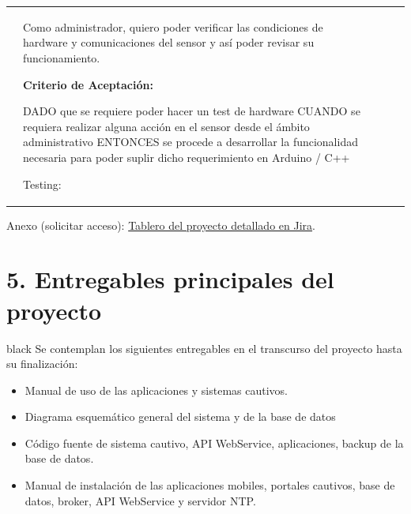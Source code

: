 \documentclass[11pt]{charter}
\begin{document}
\begin{landscape}
\begin{tabularx}{\linewidth}{@{}|p{1.3cm}|p{17cm}|p{1.7cm}|p{1.5cm}|p{1.7cm}|@{}}
         &  \begin{description}                 
                   \item Como administrador, quiero poder   verificar las condiciones de hardware y comunicaciones del sensor y así poder   revisar su funcionamiento.                 
                   \item \textbf{Criterio de Aceptación:}                 
                   \item DADO que se requiere poder hacer un test de hardware CUANDO se requiera realizar alguna acción en el sensor desde el ámbito   administrativo ENTONCES se procede a desarrollar la funcionalidad necesaria para poder   suplir dicho requerimiento en Arduino / C++                
                   \item Testing:
            \end{description}&  &     &
            

\end{tabularx}

Anexo (solicitar acceso): \href{https://kathemica.atlassian.net/secure/RapidBoard.jspa?rapidView=1&projectKey=PG&view=planning&selectedIssue=PG-41&issueLimit=100&atlOrigin=eyJpIjoiNzljYTRhZmNiZDZmNDE2YTlhMTcxM2Q0ZDJkZjQ3OTciLCJwIjoiaiJ9}{Tablero del proyecto detallado en Jira}.



\end{landscape}


\section{5. Entregables principales del proyecto}
\label{sec:entregables}

\begin{consigna}{black}
Se contemplan los siguientes entregables en el transcurso del proyecto hasta su finalización: 
	\begin{itemize}
		\item Manual de uso de las aplicaciones y sistemas cautivos.
		\item Diagrama esquemático general del sistema y de la base de datos
		\item Código fuente de sistema cautivo, API WebService, aplicaciones, backup de la  base de datos.
		\item Manual de instalación de las aplicaciones mobiles, portales cautivos, base de datos, broker, API WebService y servidor NTP.
	\end{itemize}
\end{consigna}
\end{document}
